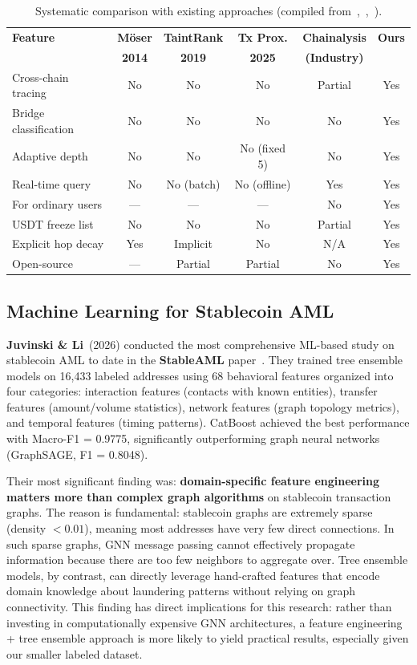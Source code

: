 \documentclass[12pt,a4paper]{article}
\begin{document}
\begin{table}[htbp]
\centering
\caption{Systematic comparison with existing approaches (compiled from~\cite{moser2014},~\cite{hercog2019},~\cite{liao2025}).}
\label{tab:comparison}
\small
\begin{tabular}{lccccc}
\toprule
\textbf{Feature} & \textbf{M\"{o}ser} & \textbf{TaintRank} & \textbf{Tx Prox.} & \textbf{Chainalysis} & \textbf{Ours} \\
 & \textbf{2014} & \textbf{2019} & \textbf{2025} & \textbf{(Industry)} & \\
\midrule
Cross-chain tracing & No & No & No & Partial & Yes \\
Bridge classification & No & No & No & No & Yes \\
Adaptive depth & No & No & No (fixed 5) & No & Yes \\
Real-time query & No & No (batch) & No (offline) & Yes & Yes \\
For ordinary users & --- & --- & --- & No & Yes \\
USDT freeze list & No & No & No & Partial & Yes \\
Explicit hop decay & Yes & Implicit & No & N/A & Yes \\
Open-source & --- & Partial & Partial & No & Yes \\
\bottomrule
\end{tabular}
\end{table}

\subsection{Machine Learning for Stablecoin AML}

\textbf{Juvinski \& Li}~(2026) conducted the most comprehensive ML-based study on stablecoin AML to date in the \textbf{StableAML} paper~\cite{juvinski2026}. They trained tree ensemble models on 16,433 labeled addresses using 68 behavioral features organized into four categories: interaction features (contacts with known entities), transfer features (amount/volume statistics), network features (graph topology metrics), and temporal features (timing patterns). CatBoost achieved the best performance with Macro-F1 = 0.9775, significantly outperforming graph neural networks (GraphSAGE, F1 = 0.8048).

Their most significant finding was: \textbf{domain-specific feature engineering matters more than complex graph algorithms} on stablecoin transaction graphs. The reason is fundamental: stablecoin graphs are extremely sparse (density $< 0.01$), meaning most addresses have very few direct connections. In such sparse graphs, GNN message passing cannot effectively propagate information because there are too few neighbors to aggregate over. Tree ensemble models, by contrast, can directly leverage hand-crafted features that encode domain knowledge about laundering patterns without relying on graph connectivity. This finding has direct implications for this research: rather than investing in computationally expensive GNN architectures, a feature engineering + tree ensemble approach is more likely to yield practical results, especially given our smaller labeled dataset.
\end{document}
